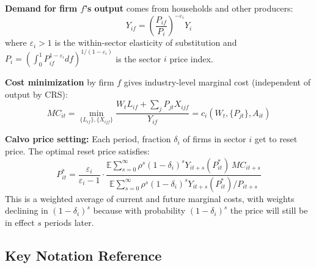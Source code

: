 \documentclass[12pt]{article}
\begin{document}
\textbf{Demand for firm $f$'s output} comes from households and other producers:
\begin{equation}
    Y_{if} = \left(\frac{P_{if}}{P_i}\right)^{-\varepsilon_i} Y_i
\end{equation}
where $\varepsilon_i > 1$ is the within-sector elasticity of substitution and $P_i = \left(\int_0^1 P_{if}^{1-\varepsilon_i} df\right)^{1/(1-\varepsilon_i)}$ is the sector $i$ price index.

\textbf{Cost minimization} by firm $f$ gives industry-level marginal cost (independent of output by CRS):
\begin{equation}
    MC_{it} = \min_{\{L_{if}\},\{X_{ijf}\}} \frac{W_t L_{if} + \sum_j P_{jt} X_{ijf}}{Y_{if}} = c_i(W_t, \{P_{jt}\}, A_{it})
\end{equation}

\textbf{Calvo price setting:} Each period, fraction $\delta_i$ of firms in sector $i$ get to reset price. The optimal reset price satisfies:
\begin{equation}
    P_{it}^* = \frac{\varepsilon_i}{\varepsilon_i - 1} \cdot \frac{\mathbb{E}\sum_{s=0}^\infty \rho^s(1-\delta_i)^s Y_{it+s}(P_{it}^*)\, MC_{it+s}}{\mathbb{E}\sum_{s=0}^\infty \rho^s(1-\delta_i)^s Y_{it+s}(P_{it}^*)/P_{it+s}}
    \label{eq:calvo_reset}
\end{equation}
This is a weighted average of current and future marginal costs, with weights declining in $(1-\delta_i)^s$ because with probability $(1-\delta_i)^s$ the price will still be in effect $s$ periods later.

\subsection{Key Notation Reference}
\end{document}
